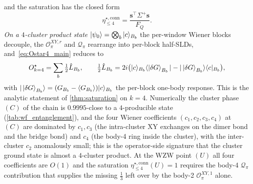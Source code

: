 \documentclass[11pt,a4paper]{article}
\newcommand{\FQ}{F_Q}
\newcommand{\SLD}{\hat{L}}
\newcommand{\PsiZ}{\ket{\psi_0}}
\newcommand{\dG}{\ket{\delta G}}
\newcommand{\etaconn}[1]{\eta^{\star,\mathrm{conn}}_{\le #1}}
\begin{document}
and the saturation has the closed form
\begin{equation}
   \etaconn{4}=\frac{\mathbf s^\top\Sigma^+\mathbf s}{\FQ}.
   \label{eq:eta4_closed}
\end{equation}
\emph{On a $4$-cluster product state}
$\PsiZ=\bigotimes_b|c\rangle_{B_b}$ the per-window Wiener blocks
decouple, the $\mathcal O^{XY,r}_\pi$ and $\mathcal Q_\pi$
rearrange into per-block half-SLDs, and~\eqref{eq:Ostar4_main}
reduces to
\begin{equation}
   O^\star_{k=4}=\sum_b\tfrac12\SLD_{B_b},\qquad
   \tfrac12\SLD_{B_b}=2i\bigl(|c\rangle_{B_b}\langle\dG_{B_b}|
   -|\dG_{B_b}\rangle\langle c|_{B_b}\bigr),
   \label{eq:Ostar4_block_main}
\end{equation}
with $|\dG_{B_b}\rangle=(G_{B_b}-\langle G_{B_b}\rangle)|c\rangle_{B_b}$
the per-block one-body response.  This is the analytic statement
of \cref{thm:saturation} on $k=4$.  Numerically the cluster phase
$(C)$ of the chain is $0.9995$-close to a $4$-producible state
(\cref{tab:wf_entanglement}), and the four Wiener coefficients
$(c_1,c_2,c_3,c_4)$ at $(C)$ are dominated by $c_1,c_3$ (the
intra-cluster XY exchanges on the dimer bond and the bridge bond)
and $c_4$ (the body-4 ring inside the cluster), with the
inter-cluster $c_2$ anomalously small; this is the operator-side
signature that the cluster ground state is almost a $4$-cluster
product.  At the WZW point $(U)$ all four coefficients are
$O(1)$ and the saturation $\etaconn{4}(U)=1$ requires the body-4
$\mathcal Q_\pi$ contribution that supplies the missing $\tfrac13$
left over by the body-2 $\mathcal O^{XY,1}_\pi$ alone.
\end{document}
